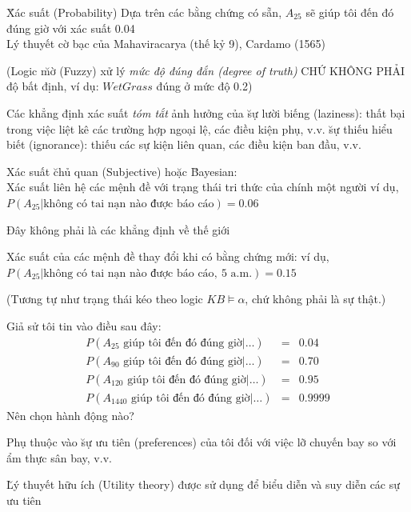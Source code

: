 \documentclass[fleqn]{article}
\begin{document}
\begin{huge}
\u{Xác suất (Probability)}\al
  Dựa trên các bằng chứng có sẵn,\nl
    $A_{25}$ sẽ giúp tôi đến đó đúng giờ với xác suất 0.04\\
Lý thuyết cờ bạc của Mahaviracarya (thế kỷ 9), Cardamo (1565)

(Logic \u{mờ (Fuzzy)} xử lý {\em mức độ đúng đắn (degree of truth)} CHỨ KHÔNG PHẢI độ bất định, ví dụ:\al
  $WetGrass$ đúng ở mức độ 0.2)




Các khẳng định xác suất {\em tóm tắt} ảnh hưởng của\al
  \u{sự lười biếng (laziness)}: thất bại trong việc liệt kê các trường hợp ngoại lệ, các điều kiện phụ, v.v.\al
  \u{sự thiếu hiểu biết (ignorance)}: thiếu các sự kiện liên quan, các điều kiện ban đầu, v.v.

Xác suất \u{chủ quan (Subjective)} hoặc \u{Bayesian}:\\
Xác suất liên hệ các mệnh đề với trạng thái tri thức của chính một người\nl
ví dụ, $P(A_{25} | \mbox{không có tai nạn nào được báo cáo}) = 0.06$

Đây \u{không} phải là các khẳng định về thế giới

Xác suất của các mệnh đề thay đổi khi có bằng chứng mới:\nl
ví dụ, $P(A_{25} | \mbox{không có tai nạn nào được báo cáo},\ \mbox{5 a.m.}) = 0.15$

(Tương tự như trạng thái kéo theo logic $KB \models \alpha$, chứ không phải là sự thật.)




Giả sử tôi tin vào điều sau đây:
\begin{eqnarray*}
P(A_{25}\mbox{ giúp tôi đến đó đúng giờ} | \ldots) &=& 0.04 \\
P(A_{90}\mbox{ giúp tôi đến đó đúng giờ} | \ldots) &=& 0.70 \\
P(A_{120}\mbox{ giúp tôi đến đó đúng giờ} | \ldots) &=& 0.95 \\
P(A_{1440}\mbox{ giúp tôi đến đó đúng giờ} | \ldots) &=& 0.9999 
\end{eqnarray*}
Nên chọn hành động nào?

Phụ thuộc vào \u{sự ưu tiên (preferences)} của tôi đối với việc lỡ chuyến bay so với ẩm thực sân bay, v.v.

\u{Lý thuyết hữu ích (Utility theory)} được sử dụng để biểu diễn và suy diễn các sự ưu tiên


\end{huge}
\end{document}
